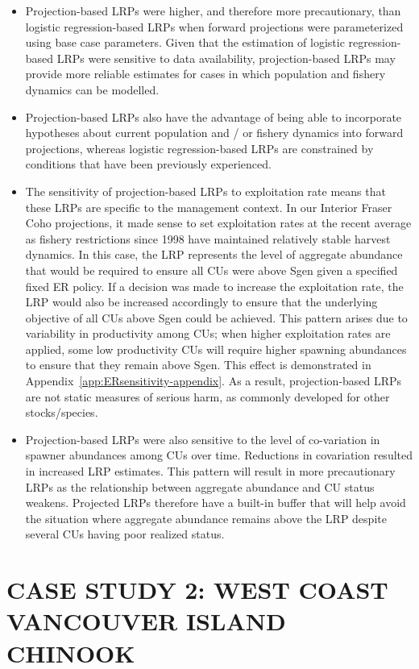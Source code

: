 \documentclass[11pt]{book}
\begin{document}
\begin{itemize}

\item
  Projection-based LRPs were higher, and therefore more precautionary, than logistic regression-based LRPs when forward projections were parameterized using base case parameters. Given that the estimation of logistic regression-based LRPs were sensitive to data availability, projection-based LRPs may provide more reliable estimates for cases in which population and fishery dynamics can be modelled.
\item
  Projection-based LRPs also have the advantage of being able to incorporate hypotheses about current population and / or fishery dynamics into forward projections, whereas logistic regression-based LRPs are constrained by conditions that have been previously experienced.
\item
  The sensitivity of projection-based LRPs to exploitation rate means that these LRPs are specific to the management context. In our Interior Fraser Coho projections, it made sense to set exploitation rates at the recent average as fishery restrictions since 1998 have maintained relatively stable harvest dynamics. In this case, the LRP represents the level of aggregate abundance that would be required to ensure all CUs were above Sgen given a specified fixed ER policy. If a decision was made to increase the exploitation rate, the LRP would also be increased accordingly to ensure that the underlying objective of all CUs above Sgen could be achieved. This pattern arises due to variability in productivity among CUs; when higher exploitation rates are applied, some low productivity CUs will require higher spawning abundances to ensure that they remain above Sgen. This effect is demonstrated in Appendix~\ref{app:ERsensitivity-appendix}. As a result, projection-based LRPs are not static measures of serious harm, as commonly developed for other stocks/species.
\item
  Projection-based LRPs were also sensitive to the level of co-variation in spawner abundances among CUs over time. Reductions in covariation resulted in increased LRP estimates. This pattern will result in more precautionary LRPs as the relationship between aggregate abundance and CU status weakens. Projected LRPs therefore have a built-in buffer that will help avoid the situation where aggregate abundance remains above the LRP despite several CUs having poor realized status.
\end{itemize}
\hypertarget{WCVIchinookChapter}{%
\section{CASE STUDY 2: WEST COAST VANCOUVER ISLAND CHINOOK}\label{WCVIchinookChapter}}
\end{document}
